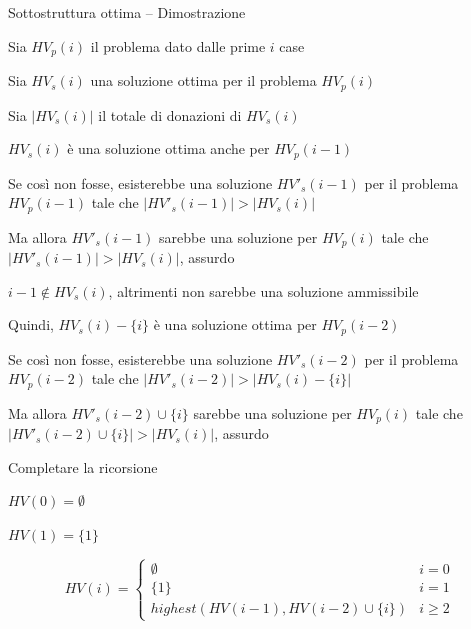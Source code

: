 \begin{frame}{Sottostruttura ottima -- Dimostrazione}

\BI
\item Sia $HV_p(i)$ il problema dato dalle prime $i$ case
\item Sia $HV_s(i)$ una soluzione ottima per il problema $HV_p(i)$
\item Sia $|HV_s(i)|$ il totale di donazioni di $HV_s(i)$
\EI

\begin{overprint}
\BIL
\item $HV_s(i)$ è una soluzione ottima anche per $HV_p(i-1)$
\item Se così non fosse, esisterebbe una soluzione $HV'_s(i-1)$ per il
problema $HV_p(i-1)$ tale che $|HV'_s(i-1)|>|HV_s(i)|$
\item Ma allora $HV'_s(i-1)$ sarebbe una soluzione per $HV_p(i)$ tale
che $|HV'_s(i-1)|>|HV_s(i)|$, assurdo
\EIL
{}
\BIL
\item $i-1 \not\in HV_s(i)$, altrimenti non sarebbe una soluzione ammissibile
\item Quindi, $HV_s(i)-\{i\}$ è una soluzione ottima per $HV_p(i-2)$
\item Se così non fosse, esisterebbe una soluzione $HV'_s(i-2)$ per il
problema $HV_p(i-2)$ tale che $|HV'_s(i-2)|>|HV_s(i)-\{i\}|$
\item Ma allora $HV'_s(i-2) \cup \{i \}$ sarebbe una soluzione per $HV_p(i)$
tale che $|HV'_s(i-2) \cup \{i\}|>|HV_s(i)|$, assurdo
\EIL
\end{overprint}


\end{frame}



\begin{frame}{Completare la ricorsione}

\vspace{-9pt}
\pause
\BIL
\item $HV(0) = \emptyset$
\item $HV(1) = \{ 1 \}$
\EIL


\[
HV(i) = \begin{cases}
  \emptyset & i=0 \\
  \{ 1 \} & i=1 \\
  \mathit{highest}(HV(i-1), HV(i-2) \cup \{ i \}) & i \geq 2
  \end{cases}
\]

\end{frame}

